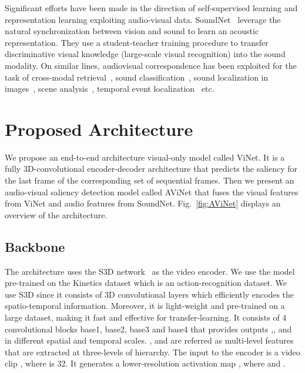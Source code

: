 \documentclass[letterpaper, 10 pt, conference]{ieeeconf}  \usepackage{times}
\begin{document}
Significant efforts have been made in the direction of self-supervised learning and representation learning exploiting audio-visual data. SoundNet~\cite{aytar2016soundnet} leverage the natural synchronization between vision and sound to learn an acoustic representation. They use a student-teacher training procedure to transfer discriminative visual knowledge (large-scale visual recognition) into the sound modality. On similar lines, audiovisual correspondence has been exploited for the task of cross-modal retrieval~\cite{arandjelovic2018objects}, sound classification~\cite{aytar2016soundnet, arandjelovic2017look}, sound localization in images~\cite{arandjelovic2018objects, senocak2018learning}, scene analysis~\cite{owens2018audio}, temporal event localization~\cite{tian2018audio} etc.



















\section{Proposed Architecture}

We propose an end-to-end architecture visual-only model called ViNet. It is a fully 3D-convolutional encoder-decoder architecture that predicts the saliency for the last frame of the corresponding set of sequential frames. Then we present an audio-visual saliency detection model called AViNet that fuses the visual features from ViNet and audio features from SoundNet. Fig.~\ref{fig:AViNet} displays an overview of the architecture. 

\subsection{Backbone}
The architecture uses the S3D network~\cite{xie2018rethinking} as the video encoder. We use the model pre-trained on the Kinetics dataset which is an action-recognition dataset. We use S3D since it consists of 3D convolutional layers which efficiently encodes the spatio-temporal information. Moreover, it is light-weight and pre-trained on a large dataset, making it fast and effective for transfer-learning. It consists of 4 convolutional blocks base1, base2, base3 and base4 that provides outputs ,, and  in different spatial and temporal scales. , and  are referred as multi-level features that are extracted at three-levels of hierarchy. The input to the encoder is a video clip , where  is 32. It generates a lower-resolution activation map , where  and .
\end{document}
